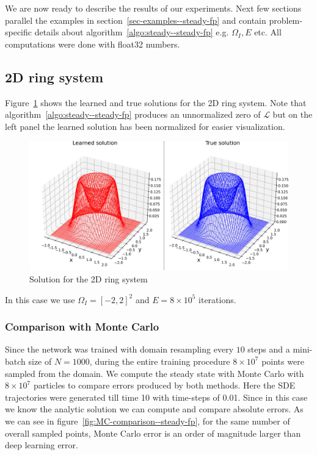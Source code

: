 We are now ready to describe the results of our experiments. Next few sections parallel the examples in section~\ref{sec-examples--steady-fp} and contain problem-specific details about algorithm~\ref{algo:steady--steady-fp} e.g. $\Omega_I, E$ etc. All computations were done with float32 numbers.
\subsection{2D ring system}Figure~\ref{fig:2D-surface--steady-fp} shows the learned and true solutions for the 2D ring system. Note that algorithm~\ref{algo:steady--steady-fp} produces an unnormalized zero of $\mathcal L$ but on the left panel the learned solution has been normalized for easier visualization. 
\begin{figure}[!ht]
    \centering
\includegraphics[scale=0.6
]{steady-fp/plots/steady-plots-2D-surface.png}
    \caption{Solution for the 2D ring system}
    \label{fig:2D-surface--steady-fp}
\end{figure}
In this case we use $\Omega_I=[-2,2]^2$ and $E=8\times10^5$ iterations. 
\subsubsection{Comparison with Monte Carlo}\label{sssec-MC-comparison--steady-fp} Since the network was trained with domain resampling every $10$ steps and a mini-batch size of $N=1000$, during the entire training procedure $8\times10^7$ points were sampled from the domain. We compute the steady state with Monte Carlo with $8\times10^7$ particles to compare errors produced by both methods. Here the SDE trajectories were generated till time 10 with time-steps of 0.01. Since in this case we know the analytic solution we can compute and compare absolute errors. As we can see in figure~\ref{fig:MC-comparison--steady-fp}, for the same number of overall sampled points, Monte Carlo error is an order of magnitude larger than deep learning error. 

